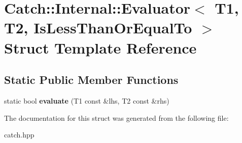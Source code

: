 \hypertarget{structCatch_1_1Internal_1_1Evaluator_3_01T1_00_01T2_00_01IsLessThanOrEqualTo_01_4}{}\section{Catch\+:\+:Internal\+:\+:Evaluator$<$ T1, T2, Is\+Less\+Than\+Or\+Equal\+To $>$ Struct Template Reference}
\label{structCatch_1_1Internal_1_1Evaluator_3_01T1_00_01T2_00_01IsLessThanOrEqualTo_01_4}
\subsection*{Static Public Member Functions}
\begin{DoxyCompactItemize}
\item 
static bool {\bfseries evaluate} (T1 const \&lhs, T2 const \&rhs)\hypertarget{structCatch_1_1Internal_1_1Evaluator_3_01T1_00_01T2_00_01IsLessThanOrEqualTo_01_4_adf269a597e4d82d69f29bcb516297b9b}{}\label{structCatch_1_1Internal_1_1Evaluator_3_01T1_00_01T2_00_01IsLessThanOrEqualTo_01_4_adf269a597e4d82d69f29bcb516297b9b}

\end{DoxyCompactItemize}


The documentation for this struct was generated from the following file\+:\begin{DoxyCompactItemize}
\item 
catch.\+hpp\end{DoxyCompactItemize}
